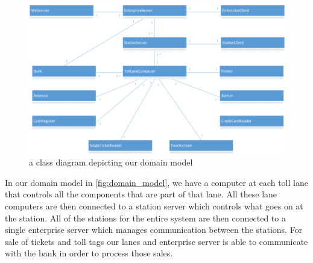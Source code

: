 \begin{figure}
\centering
\includegraphics[width=1\textwidth]{img/domain_model/domain_model.png}
\caption{a class diagram depicting our domain model}
\label{fig:domain_model}
\end{figure}

In our domain model in {\autoref{fig:domain_model}}, we have a computer at each toll lane that controls all the components that are part of that lane. All these lane computers are then connected to a station server which controls what goes on at the station. All of the stations for the entire system are then connected to a single enterprise server which manages communication between the stations. For sale of tickets and toll tags our lanes and enterprise server is able to communicate with the bank in order to process those sales.